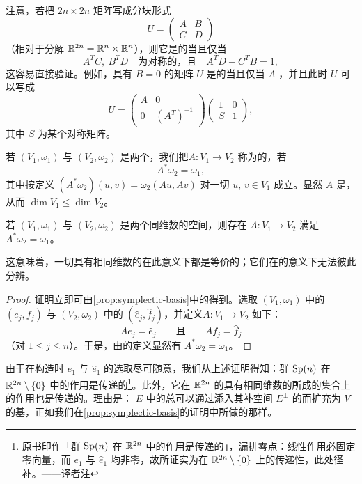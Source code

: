 注意，若把 $2n\times 2n$ 矩阵写成分块形式
\begin{equation}\label{eq:block-form}
U=\begin{pmatrix}A & B\\ C & D\end{pmatrix}
\end{equation}
（相对于分解 $\mathbb{R}^{2n}=\mathbb{R}^{n}\times\mathbb{R}^{n}$），则它是\trSymplectic{}的当且仅当
\[
A^{T}C,\ B^{T}D \quad\text{为对称的，且}\quad A^{T}D-C^{T}B=1,
\]
这容易直接验证。例如，具有 $B=0$ 的矩阵 $U$ 是\trSymplectic{}的当且仅当 $A$ \trNonsingular{}，并且此时 $U$ 可以写成
\[
U=\begin{pmatrix}A & 0\\ 0 & (A^{T})^{-1}\end{pmatrix} \begin{pmatrix}1 & 0\\ S & 1\end{pmatrix},
\]
其中 $S$ 为某个对称矩阵。

\begin{definition}\label{def:symplectic-map-between-spaces}
若 $(V_1,\omega_1)$ 与 $(V_2,\omega_2)$ 是两个\trSymplecticVectorSpace{}，我们把\trLinear\trMapping $A:V_1\to V_2$ 称为\trSymplectic{}的，若
\[
A^{*}\omega_2=\omega_1,
\]
其中按定义 $(A^{*}\omega_2)(u,v)=\omega_2(Au,Av)$ 对一切 $u$, $v\in V_1$ 成立。显然 $A$ 是\trInjective{}，从而 $\dim V_1\leq\dim V_2$。
\end{definition}

\begin{proposition}\label{prop:same-dim-isomorphism}
若 $(V_1,\omega_1)$ 与 $(V_2,\omega_2)$ 是两个同维数的\trSymplectic{}空间，则存在\trLinear\trIsomorphism{} $A:V_1\to V_2$ 满足 $A^{*}\omega_2=\omega_1$。
\end{proposition}

这意味着，一切具有相同维数的\trSymplecticVectorSpace{}在此意义下都是等价的；它们在\trSymplectic{}的意义下无法彼此分辨。

\begin{proof}
证明立即可由\cref{prop:symplectic-basis}中的\trNormalForm{}得到。选取 $(V_1,\omega_1)$ 中的\trSymplecticBasis{} $(e_j,f_j)$ 与 $(V_2,\omega_2)$ 中的\trSymplecticBasis{} $(\hat{e}_j,\hat{f}_j)$，并定义\trLinear\trMapping $A:V_1\to V_2$ 如下：
\[
Ae_j=\hat{e}_j \qquad\text{且}\qquad Af_j=\hat{f}_j
\]
（对 $1\leq j\leq n$）。于是，由\trSymplecticBasis{}的定义显然有 $A^{*}\omega_2=\omega_1$。
\end{proof}

由于在构造\trSymplecticBasis{}时 $e_1$ 与 $\hat{e}_1$ 的选取尽可随意，我们从上述证明得知：群 $\operatorname{Sp}(n)$ 在 $\mathbb{R}^{2n}\setminus\{0\}$ 中的作用是传递的\footnote{原书印作「群 $\operatorname{Sp}(n)$ 在 $\mathbb{R}^{2n}$ 中的作用是传递的」，漏排零点：线性作用必固定零向量，而 $e_1$ 与 $\hat{e}_1$ 均非零，故所证实为在 $\mathbb{R}^{2n}\setminus\{0\}$ 上的传递性，此处径补。——译者注}。此外，它在 $\mathbb{R}^{2n}$ 的具有相同维数的\trSymplectic\trSubspace{}所成的集合上的作用也是传递的。理由是：\trSubspace{} $E$ 中的\trSymplecticBasis{}总可以通过添入其补空间 $E^{\perp}$ 的\trSymplecticBasis{}而扩充为 $V$ 的基，正如我们在\cref{prop:symplectic-basis}的证明中所做的那样。
